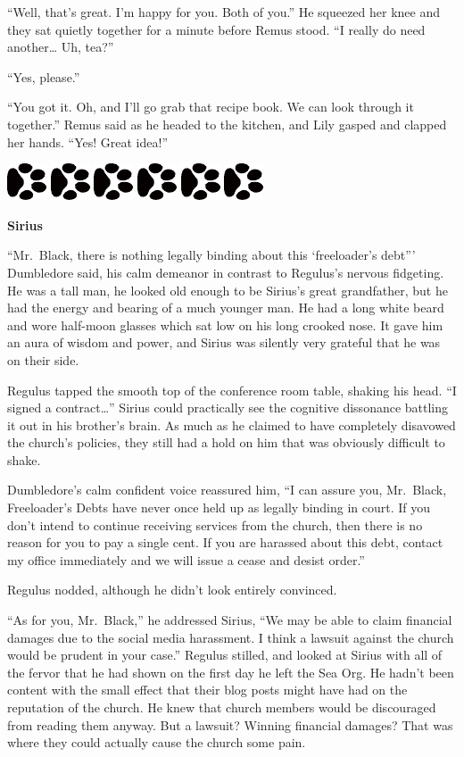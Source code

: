 \documentclass[12pt,twoside,openright]{memoir}
\newcommand{\myrulez}{	
	\begin{center}
		\hspace{.5em}
		\includegraphics[angle=60]{dogprint.pdf}
		\hspace{.5em}
		\includegraphics[angle=120]{dogprint.pdf}
		\hspace{.5em}
		\includegraphics[angle=60]{dogprint.pdf}
		\hspace{.5em}
		\includegraphics[angle=120]{dogprint.pdf}
		\hspace{.5em}
		\includegraphics[angle=60]{dogprint.pdf}
		\hspace{.5em}
		\includegraphics[angle=120]{dogprint.pdf}
		\hspace{.5em}
	\end{center}
}
\begin{document}
``Well, that's great. I'm happy for you. Both of you.'' He squeezed her knee and they sat quietly together for a minute before Remus stood. ``I really do need another… Uh, tea?''

``Yes, please.'' 

``You got it. Oh, and I'll go grab that recipe book. We can look through it together.'' Remus said as he headed to the kitchen, and Lily gasped and clapped her hands. ``Yes! Great idea!''

\myrulez

\textbf{Sirius} 

``Mr.\ Black, there is nothing legally binding about this ‘freeloader's debt''' Dumbledore said, his calm demeanor in contrast to Regulus's nervous fidgeting. He was a tall man, he looked old enough to be Sirius's great grandfather, but he had the energy and bearing of a much younger man. He had a long white beard and wore half-moon glasses which sat low on his long crooked nose. It gave him an aura of wisdom and power, and Sirius was silently very grateful that he was on their side.

Regulus tapped the smooth top of the conference room table, shaking his head. ``I signed a contract…'' Sirius could practically see the cognitive dissonance battling it out in his brother's brain. As much as he claimed to have completely disavowed the church's policies, they still had a hold on him that was obviously difficult to shake. 

Dumbledore's calm confident voice reassured him, ``I can assure you, Mr.\ Black, Freeloader's Debts have never once held up as legally binding in court. If you don't intend to continue receiving services from the church, then there is no reason for you to pay a single cent. If you are harassed about this debt, contact my office immediately and we will issue a cease and desist order.''

Regulus nodded, although he didn't look entirely convinced.

``As for you, Mr.\ Black,'' he addressed Sirius, ``We may be able to claim financial damages due to the social media harassment. I think a lawsuit against the church would be prudent in your case.'' Regulus stilled, and looked at Sirius with all of the fervor that he had shown on the first day he left the Sea Org. He hadn't been content with the small effect that their blog posts might have had on the reputation of the church. He knew that church members would be discouraged from reading them anyway. But a lawsuit? Winning financial damages? That was where they could actually cause the church some pain. 
\end{document}
